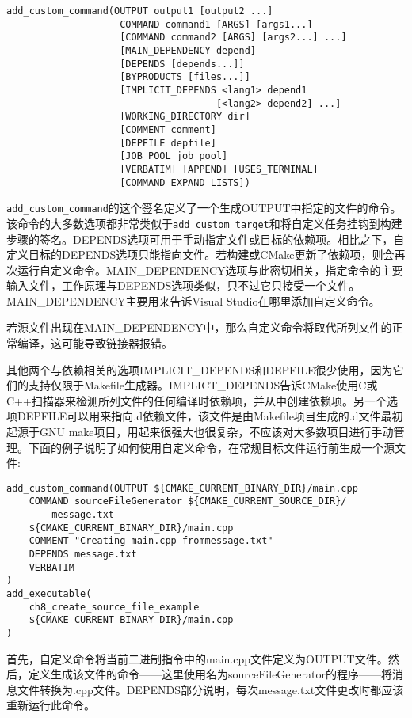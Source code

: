 \begin{lstlisting}[style=styleCMake]
add_custom_command(OUTPUT output1 [output2 ...]
					COMMAND command1 [ARGS] [args1...]
					[COMMAND command2 [ARGS] [args2...] ...]
					[MAIN_DEPENDENCY depend]
					[DEPENDS [depends...]]
					[BYPRODUCTS [files...]]
					[IMPLICIT_DEPENDS <lang1> depend1
									 [<lang2> depend2] ...]
					[WORKING_DIRECTORY dir]
					[COMMENT comment]
					[DEPFILE depfile]
					[JOB_POOL job_pool]
					[VERBATIM] [APPEND] [USES_TERMINAL]
					[COMMAND_EXPAND_LISTS])
\end{lstlisting}

\texttt{add\_custom\_command}的这个签名定义了一个生成OUTPUT中指定的文件的命令。该命令的大多数选项都非常类似于\texttt{add\_custom\_target}和将自定义任务挂钩到构建步骤的签名。DEPENDS选项可用于手动指定文件或目标的依赖项。相比之下，自定义目标的DEPENDS选项只能指向文件。若构建或CMake更新了依赖项，则会再次运行自定义命令。MAIN\_DEPENDENCY选项与此密切相关，指定命令的主要输入文件，工作原理与DEPENDS选项类似，只不过它只接受一个文件。MAIN\_DEPENDENCY主要用来告诉Visual Studio在哪里添加自定义命令。

\begin{tcolorbox}[colback=webgreen!5!white,colframe=webgreen!75!black,title=Note]
若源文件出现在MAIN\_DEPENDENCY中，那么自定义命令将取代所列文件的正常编译，这可能导致链接器报错。
\end{tcolorbox}

其他两个与依赖相关的选项IMPLICIT\_DEPENDS和DEPFILE很少使用，因为它们的支持仅限于Makefile生成器。IMPLICT\_DEPENDS告诉CMake使用C或C++扫描器来检测所列文件的任何编译时依赖项，并从中创建依赖项。另一个选项DEPFILE可以用来指向.d依赖文件，该文件是由Makefile项目生成的.d文件最初起源于GNU make项目，用起来很强大也很复杂，不应该对大多数项目进行手动管理。下面的例子说明了如何使用自定义命令，在常规目标文件运行前生成一个源文件:

\begin{lstlisting}[style=styleCMake]
add_custom_command(OUTPUT ${CMAKE_CURRENT_BINARY_DIR}/main.cpp
	COMMAND sourceFileGenerator ${CMAKE_CURRENT_SOURCE_DIR}/
		message.txt
	${CMAKE_CURRENT_BINARY_DIR}/main.cpp
	COMMENT "Creating main.cpp frommessage.txt"
	DEPENDS message.txt
	VERBATIM
)
add_executable(
	ch8_create_source_file_example
	${CMAKE_CURRENT_BINARY_DIR}/main.cpp
)
\end{lstlisting}

首先，自定义命令将当前二进制指令中的main.cpp文件定义为OUTPUT文件。然后，定义生成该文件的命令——这里使用名为sourceFileGenerator的程序——将消息文件转换为.cpp文件。DEPENDS部分说明，每次message.txt文件更改时都应该重新运行此命令。


